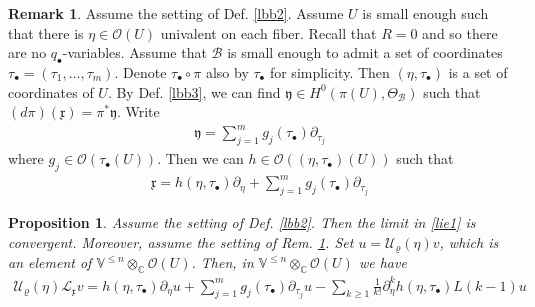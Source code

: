 \documentclass[11pt,b5paper,notitlepage]{article}
\theoremstyle{definition}
\newtheorem{rem}[df]{Remark}
\theoremstyle{plain}
\newtheorem{pp}[df]{Proposition}
\newcommand{\mc}{\mathcal}
\newcommand{\xk}{\mathfrak x}
\newcommand{\yk}{\mathfrak y}
\newcommand{\blt}{\bullet}
\newcommand{\Vbb}{\mathbb V}
\newcommand{\Cbb}{\mathbb C}
\newcommand{\<}{\left\langle}
\renewcommand{\>}{\right\rangle}
\newcommand{\MO}{\mathcal{O}}
\newcommand{\MB}{\mathcal{B}}
\numberwithin{equation}{subsection}
\begin{document}
\begin{rem}\label{lbb68}
Assume the setting of Def. \ref{lbb2}. Assume $U$ is small enough such that there is $\eta\in \MO(U)$ univalent on each fiber. Recall that $R=0$ and so there are no $q_\blt$-variables. Assume that $\MB$ is small enough to admit a set of coordinates $\tau_\blt=(\tau_1,\dots,\tau_m)$. Denote $\tau_\blt\circ \pi$ also by $\tau_\blt$ for simplicity. Then $(\eta,\tau_\blt)$ is a set of coordinates of $U$. By Def. \ref{lbb3}, we can find $\yk\in H^0(\pi(U),\Theta_\MB)$ such that $(d\pi)(\xk)=\pi^*\yk$. Write
\begin{align}
\yk=\sum_{j=1}^m g_j(\tau_\blt)\partial_{\tau_j}
\end{align}
where $g_j\in\mc O(\tau_\blt(U))$. Then we can $h\in \mc O((\eta,\tau_\blt)(U))$ such that
\begin{align}\label{eqb21}
    \xk=h(\eta,\tau_\blt)\partial_\eta+\sum_{j=1}^m g_j(\tau_\blt)\partial_{\tau_j}
\end{align}
\end{rem}




\begin{pp}\label{lbb5}
Assume the setting of Def. \ref{lbb2}. Then the limit in \eqref{lie1} is convergent. Moreover, assume the setting of Rem. \ref{lbb68}. Set $u=\mc U_\varrho(\eta)v$, which is an element of $\Vbb^{\leq n}\otimes_\Cbb\mc O(U)$. Then, in $\Vbb^{\leq n}\otimes_\Cbb\mc O(U)$ we have
\begin{align}\label{eqb24}
\mc U_\varrho(\eta)\mc L_\xk v=
    h(\eta,\tau_\blt)\partial_\eta u+\sum_{j=1}^m g_j(\tau_\blt)\partial_{\tau_j}u-\sum_{k\geq 1}\frac{1}{k!}\partial_\eta^k h(\eta,\tau_\blt)L(k-1)u
\end{align}
\end{pp}
\end{document}
